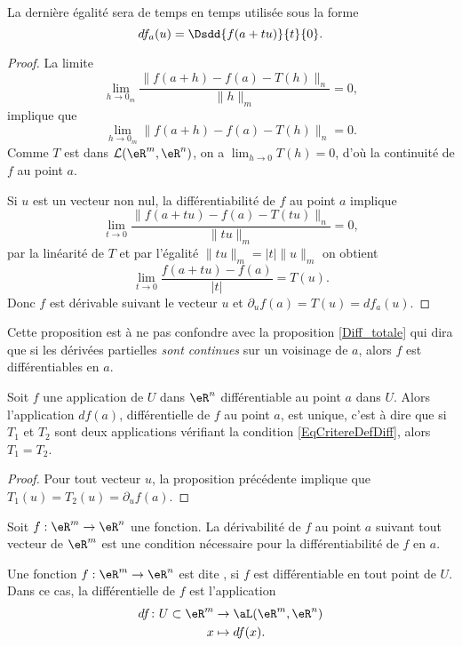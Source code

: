 La dernière égalité sera de temps en temps utilisée sous la forme
\begin{equation}    \label{EqOWQSoMA}
    df_a(u)=\Dsdd{ f(a+tu) }{t}{0}.
\end{equation}

\begin{proof}
  La limite
\[
\lim_{h\to 0_m}\frac{\|f(a+h)-f(a)-T(h)\|_n}{\|h\|_m}=0,
\]
implique que
 \[
\lim_{h\to 0_m}\|f(a+h)-f(a)-T(h)\|_n=0.
\]
Comme $T$ est dans $\mathcal{L}(\eR^m,\eR^n)$, on a $\lim_{h\to 0}T(h)=0$, d'où la continuité de $f$ au point $a$.

Si $u$ est un vecteur non nul, la différentiabilité de $f$ au point $a$ implique
\[
\lim_{t\to 0}\frac{\|f(a+tu)-f(a)-T(tu)\|_n}{\|tu\|_m}=0,
\]
par la linéarité de $T$ et par l'égalité $\|tu\|_m=|t|\|u\|_m$ on obtient
\[
\lim_{t\to 0}\frac{f(a+tu)-f(a)}{|t|}= T(u).
\]
Donc $f$ est dérivable suivant le vecteur $u$ et $\partial_uf(a)=T(u)=df_a(u)$.
\end{proof}

Cette proposition est à ne pas confondre avec la proposition \ref{Diff_totale} qui dira que si les dérivées partielles \emph{sont continues} sur un voisinage de $a$, alors $f$ est différentiables en $a$.

\begin{corollary}
	Soit $f$ une application de $U$ dans $\eR^n$ différentiable au point $a$ dans $U$. Alors l'application $df(a)$, différentielle de $f$ au point $a$, est unique, c'est à dire que si $T_1$ et $T_2$ sont deux applications vérifiant la condition \eqref{EqCritereDefDiff}, alors $T_1=T_2$.
\end{corollary}

\begin{proof}
	Pour tout vecteur $u$, la proposition précédente implique que $T_1(u)=T_2(u)=\partial_uf(a)$.
\end{proof}

\begin{corollary}
Soit  $f:\eR^m\to \eR^n$ une fonction.
  La dérivabilité de $f$ au point  $a$ suivant tout vecteur de $\eR^m$ est une condition nécessaire pour la différentiabilité de $f$ en $a$.
\end{corollary}

\begin{definition}
	Une fonction $f:\eR^m\to \eR^n$ est dite , si $f$ est différentiable en tout point de $U$. Dans ce cas, la différentielle de $f$ est l'application
	\begin{equation}
		\begin{aligned}
			df\colon U\subset\eR^m&\to \aL(\eR^m,\eR^n) \\
			x&\mapsto df(x). 
		\end{aligned}
	\end{equation}
\end{definition}

